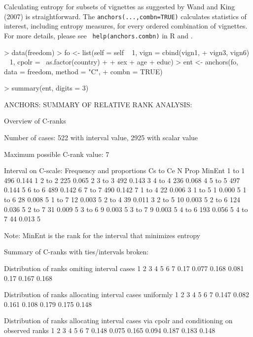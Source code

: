 \documentclass{amsart}
\newcommand{\code}[1]{{\texttt{#1}}}
\begin{document}
Calculating entropy for subsets of vignettes as suggested by Wand and
King (2007) is straightforward.  The \code{anchors(...,combn=TRUE)}
calculates statistics of interest, including entropy measures, for
every ordered combination of vignettes.  For more details, please see {\tt
help(anchors.combn)} in R and \cite{king.wand:2007}.
\begin{Schunk}
\begin{Sinput}
> data(freedom)
> fo <- list(self = self ~ 1, vign = cbind(vign1, 
+     vign3, vign6) ~ 1, cpolr = ~as.factor(country) + 
+     sex + age + educ)
> ent <- anchors(fo, data = freedom, method = "C", 
+     combn = TRUE)
\end{Sinput}
\end{Schunk}
\begin{Schunk}
\begin{Sinput}
> summary(ent, digits = 3)
\end{Sinput}
\begin{Soutput}
ANCHORS: SUMMARY OF RELATIVE RANK ANALYSIS:

Overview of C-ranks

Number of cases: 522 with interval value, 2925 with scalar value

Maximum possible C-rank value: 7

Interval on C-scale: Frequency and proportions Cs to Ce
           N  Prop MinEnt
 1 to  1 496 0.144      1
 2 to  2 225 0.065      2
 3 to  3 492 0.143      3
 4 to  4 236 0.068      4
 5 to  5 497 0.144      5
 6 to  6 489 0.142      6
 7 to  7 490 0.142      7
 1 to  4  22 0.006      3
 1 to  5   1 0.000      5
 1 to  6  28 0.008      5
 1 to  7  12 0.003      5
 2 to  4  39 0.011      3
 2 to  5  10 0.003      5
 2 to  6 124 0.036      5
 2 to  7  31 0.009      5
 3 to  6   9 0.003      5
 3 to  7   9 0.003      5
 4 to  6 193 0.056      5
 4 to  7  44 0.013      5

Note: MinEnt is the rank for the interval that minimizes entropy

Summary of C-ranks with ties/intervals broken:

Distribution of ranks omiting interval cases
    1     2     3     4    5     6     7
 0.17 0.077 0.168 0.081 0.17 0.167 0.168

Distribution of ranks allocating interval cases uniformly
     1     2     3     4     5     6     7
 0.147 0.082 0.161 0.108 0.179 0.175 0.148

Distribution of ranks allocating interval cases via cpolr
and conditioning on observed ranks
    1     2     3     4     5     6     7 
0.148 0.075 0.165 0.094 0.187 0.183 0.148 


\end{Soutput}
\end{Schunk}
\end{document}
